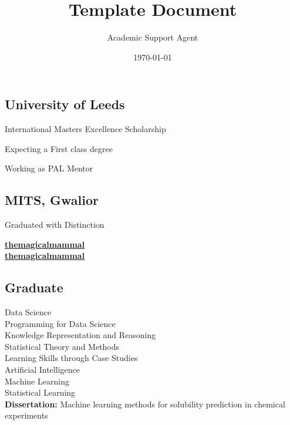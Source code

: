 \documentclass{article}
\title{Template Document}
\author{Academic Support Agent}
\date{\today}
\begin{document}
\maketitle

\lastupdated


\begin{minipage}[t]{0.33\textwidth} 


\subsection{University of Leeds}
\vspace{\topsep} %
\begin{tightemize}
\item International Masters Excellence Scholarship
\item Expecting a First class degree
\item Working as PAL Mentor
\end{tightemize}
\sectionsep

\subsection{MITS, Gwalior}
Graduated with Distinction
\sectionsep


 \href{https://github.com/themagicalmammal}{\bf themagicalmammal} \\
 \href{https://www.linkedin.com/in/themagicalmammal/}{\bf themagicalmammal}
\sectionsep


\subsection{Graduate}
Data Science \\
Programming for Data Science \\
Knowledge Representation and Reasoning \\
Statistical Theory and Methods \\
Learning Skills through Case Studies \\
Artificial Intelligence \\
Machine Learning \\
Statistical Learning \\ 
\textbf{Dissertation: }
Machine learning methods for solubility prediction in chemical experiments
\sectionsep


\end{minipage}
\end{document}
